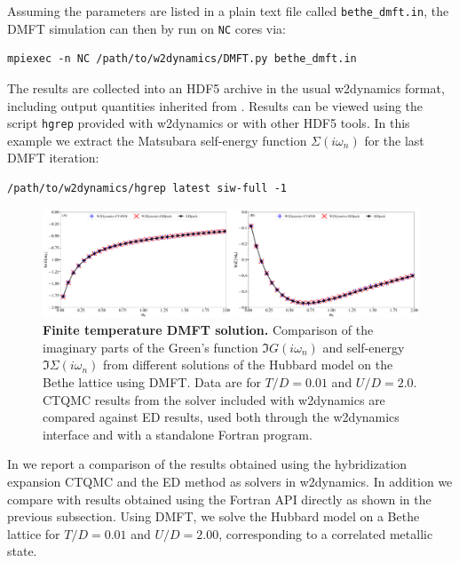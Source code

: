 \documentclass[edipack_sp.tex]{subfiles}
\begin{document}
Assuming the parameters are listed in a plain text file called 
{\tt bethe\_dmft.in}, the DMFT simulation can then by run on {\tt NC} cores via:
\begin{lstlisting}[style=mybash,numbers=none,morekeywords={mpiexec},deletekeywords={in}]
mpiexec -n NC /path/to/w2dynamics/DMFT.py bethe_dmft.in
\end{lstlisting}

The results are collected into an HDF5 \cite{The_HDF_Group_Hierarchical_Data_Format} archive in the usual w2dynamics format, including output quantities inherited from \NAME. Results can be viewed using the script {\tt hgrep} provided with w2dynamics or with other HDF5 tools. In this example we extract the Matsubara self-energy function $\Sigma(i\omega_n)$ for the last DMFT iteration:
\begin{lstlisting}[style=mybash,numbers=none]
/path/to/w2dynamics/hgrep latest siw-full -1
\end{lstlisting}

\begin{figure}%
  \includegraphics[width=\linewidth]{figures/figBetheW2D.pdf}
    \caption{\label{figEx1W}%
    \textbf{Finite temperature DMFT solution.}
    Comparison of the imaginary parts of the Green's function $\Im{G}(i\omega_n)$ and self-energy $\Im{\Sigma}(i\omega_n)$ from different solutions of the Hubbard model on the Bethe lattice using DMFT. Data are for $T/D=0.01$ and $U/D=2.0$. CTQMC results from the solver included with w2dynamics are compared against \NAME ED results, used both through the w2dynamics interface and with a standalone Fortran program. 
        }
\end{figure}

In  we report a comparison of the results obtained using the hybridization expansion CTQMC and the \NAME ED method as solvers in w2dynamics. In addition we compare with results obtained using the Fortran API directly as shown in the previous subsection. Using DMFT, we solve the Hubbard model on a Bethe lattice for $T/D=0.01$ and $U/D=2.00$, corresponding to a correlated metallic state. 
\end{document}
